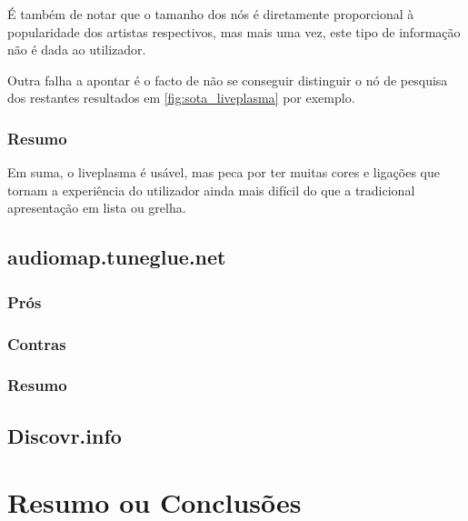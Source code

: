 É também de notar que o tamanho dos nós é diretamente proporcional à popularidade dos artistas respectivos, mas mais uma vez, este tipo de informação não é dada ao utilizador.

Outra falha a apontar é o facto de não se conseguir distinguir o nó de pesquisa dos restantes resultados em \ref{fig:sota_liveplasma} por exemplo.


\subsubsection{Resumo} %
\label{ssub:liveplasma_resumo}

Em suma, o liveplasma é usável, mas peca por ter muitas cores e ligações que tornam a experiência do utilizador ainda mais difícil do que a tradicional apresentação em lista ou grelha.



\subsection{audiomap.tuneglue.net} %
\label{sub:projeto_2}



\subsubsection{Prós} %
\label{ssub:audiomap_pros}


\subsubsection{Contras} %
\label{ssub:audiomap_contras}


\subsubsection{Resumo} %
\label{ssub:audiomap_resumo}



\subsection{Discovr.info} %
\label{sub:projeto_3}





\section{Resumo ou Conclusões}

